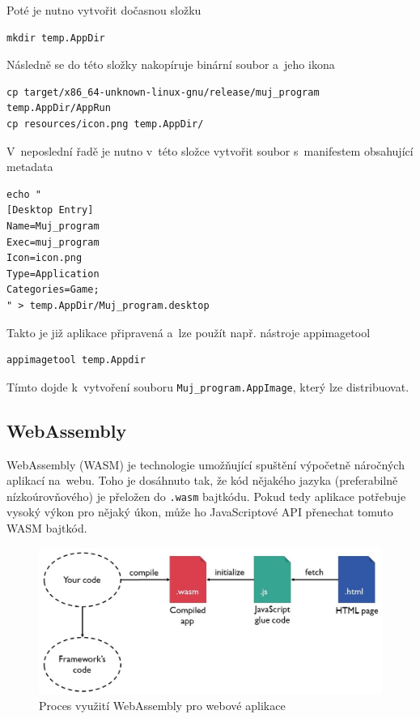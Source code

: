\documentclass[a4paper, 12pt]{article} %
\begin{document}
        Poté je nutno vytvořit dočasnou složku
        \begin{verbatim}
mkdir temp.AppDir
        \end{verbatim}
        
        Následně se do této složky nakopíruje binární soubor a~jeho ikona
        \begin{verbatim}
cp target/x86_64-unknown-linux-gnu/release/muj_program temp.AppDir/AppRun
cp resources/icon.png temp.AppDir/
        \end{verbatim}
        
        V~neposlední řadě je nutno v~této složce vytvořit soubor s~manifestem obsahující metadata
        \begin{verbatim}
echo "
[Desktop Entry]
Name=Muj_program
Exec=muj_program
Icon=icon.png
Type=Application
Categories=Game;
" > temp.AppDir/Muj_program.desktop
        \end{verbatim}

        Takto je již aplikace připravená a~lze použít např. nástroje appimagetool\cite{appimagetool}
        \begin{verbatim}
appimagetool temp.Appdir
        \end{verbatim}

        Tímto dojde k~vytvoření souboru \texttt{Muj\_program.AppImage}, který lze distribuovat.


    \subsection{WebAssembly}
        WebAssembly (WASM) je technologie umožňující spuštění výpočetně náročných aplikací na~webu. Toho je dosáhnuto tak, že kód nějakého jazyka (preferabilně nízkoúrovňového) je přeložen do \texttt{.wasm} bajtkódu. Pokud tedy aplikace potřebuje vysoký výkon pro nějaký úkon, může ho JavaScriptové API přenechat tomuto WASM bajtkód.\cite{wasm}
        
        \begin{center}
            \begin{figure}[H]
                \centering
                \includegraphics[width=13cm]{wasm}
                \caption{Proces využití WebAssembly pro webové aplikace \cite{wasm_fig}}
                \label{fig:wasm}
            \end{figure}
        \end{center}
        
\end{document}
